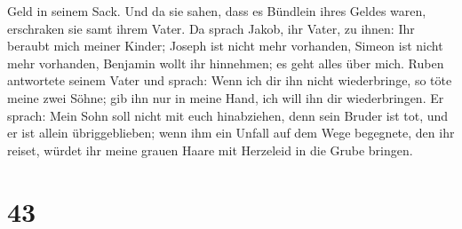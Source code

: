 Geld in seinem Sack. Und da sie sahen, dass es Bündlein ihres Geldes
waren, erschraken sie samt ihrem Vater.  Da sprach Jakob,
ihr Vater, zu ihnen: Ihr beraubt mich meiner Kinder; Joseph ist nicht
mehr vorhanden, Simeon ist nicht mehr vorhanden, Benjamin wollt ihr
hinnehmen; es geht alles über mich.  Ruben antwortete
seinem Vater und sprach: Wenn ich dir ihn nicht wiederbringe, so töte
meine zwei Söhne; gib ihn nur in meine Hand, ich will ihn dir
wiederbringen.  Er sprach: Mein Sohn soll nicht mit euch
hinabziehen, denn sein Bruder ist tot, und er ist allein übriggeblieben;
wenn ihm ein Unfall auf dem Wege begegnete, den ihr reiset, würdet ihr
meine grauen Haare mit Herzeleid in die Grube bringen.

\hypertarget{section-42}{%
\section{43}\label{section-42}}

